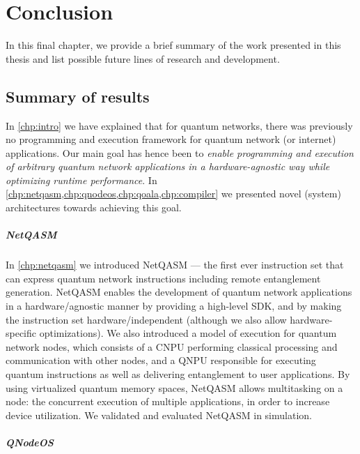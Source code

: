 \chapter{Conclusion}
\label{chp:conclusion}


In this final chapter, we provide a brief summary of the work presented in this thesis and list possible future lines of research and development.

\section{Summary of results}
In \cref{chp:intro} we have explained that for quantum networks, there was previously no programming and execution framework for quantum network (or internet) applications.
Our main goal has hence been to \emph{enable programming and execution of arbitrary quantum network applications in a hardware-agnostic way while optimizing runtime performance}.
In \cref{chp:netqasm,chp:qnodeos,chp:qoala,chp:compiler} we presented novel (system) architectures towards achieving this goal.


\paragraph{NetQASM}
In \cref{chp:netqasm} we introduced NetQASM --- the first ever instruction set that can express quantum network instructions including remote entanglement generation.
NetQASM enables the development of quantum network applications in a hardware\-/agnostic manner by providing a high-level SDK, and by making the instruction set hardware\-/independent (although we also allow hardware-specific optimizations).
We also introduced a model of execution for quantum network nodes, which consists of a CNPU performing classical processing and communication with other nodes, and a QNPU responsible for executing quantum instructions as well as delivering entanglement to user applications.
By using virtualized quantum memory spaces, NetQASM allows multitasking on a node: the concurrent execution of multiple applications, in order to increase device utilization.
We validated and evaluated NetQASM in simulation.


\paragraph{QNodeOS}

